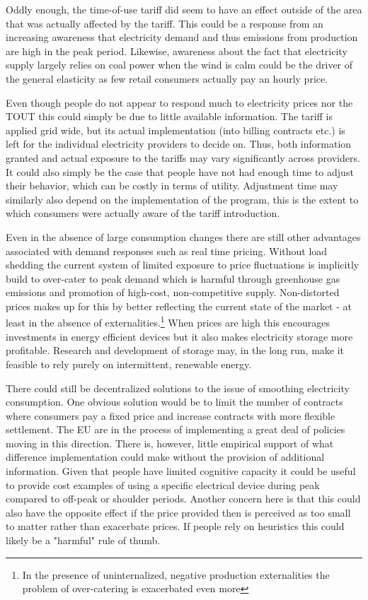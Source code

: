 Oddly enough, the time-of-use tariff did seem to have an effect outside of the area that was actually affected by the tariff. This could be a response from an increasing awareness that electricity demand and thus emissions from production are high in the peak period. Likewise, awareness about the fact that electricity supply largely relies on coal power when the wind is calm could be the driver of the general elasticity as few retail consumers actually pay an hourly price.
\par
Even though people do not appear to respond much to electricity prices nor the TOUT this could simply be due to little available information. The tariff is applied grid wide, but its actual implementation (into billing contracts etc.) is left for the individual electricity providers to decide on. Thus, both information granted and actual exposure to the tariffs may vary significantly across providers. It could also simply be the case that people have not had enough time to adjust their behavior, which can be costly in terms of utility. Adjustment time may similarly also depend on the implementation of the program, this is the extent to which consumers were actually aware of the tariff introduction.
\bigskip

Even in the absence of large consumption changes there are still other advantages associated with demand responses such as real time pricing. Without load shedding the current system of limited exposure to price fluctuations is implicitly build to over-cater to peak demand which is harmful through greenhouse gas emissions and promotion of high-cost, non-competitive supply. Non-distorted prices makes up for this by better reflecting the current state of the market - at least in the absence of externalities.\footnote{In the presence of uninternalized, negative production externalities the problem of over-catering is exacerbated even more} When prices are high this encourages investments in energy efficient devices but it also makes electricity storage more profitable. Research and development of storage may, in the long run, make it feasible to rely purely on intermittent, renewable energy.
\bigskip

There could still be decentralized solutions to the issue of smoothing electricity consumption. One obvious solution would be to limit the number of contracts where consumers pay a fixed price and increase contracts with more flexible settlement. The EU are in the process of implementing a great deal of policies moving in this direction. There is, however, little empirical support of what difference implementation could make without the provision of additional information. Given that people have limited cognitive capacity it could be useful to provide cost examples of using a specific electrical device during peak compared to off-peak or shoulder periods.
Another concern here is that this could also have the opposite effect if the price provided then is perceived as too small to matter rather than exacerbate prices. If people rely on heuristics this could likely be a "harmful" rule of thumb.
\bigskip

